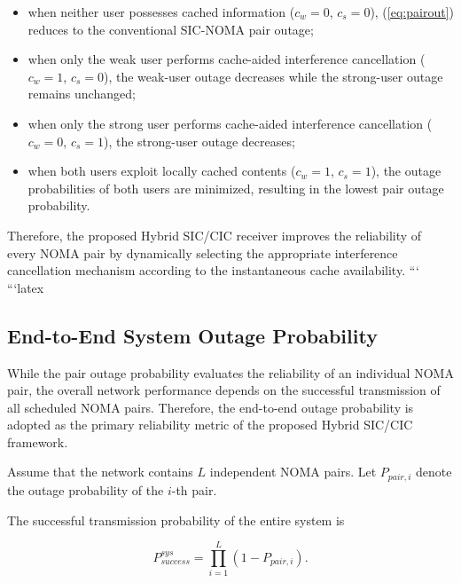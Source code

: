 \documentclass[conference]{IEEEtran}
\begin{document}
\begin{itemize}

\item when neither user possesses cached information ($c_w=0$, $c_s=0$), (\ref{eq:pairout}) reduces to the conventional SIC-NOMA pair outage;

\item when only the weak user performs cache-aided interference cancellation ($c_w=1$, $c_s=0$), the weak-user outage decreases while the strong-user outage remains unchanged;

\item when only the strong user performs cache-aided interference cancellation ($c_w=0$, $c_s=1$), the strong-user outage decreases;

\item when both users exploit locally cached contents ($c_w=1$, $c_s=1$), the outage probabilities of both users are minimized, resulting in the lowest pair outage probability.

\end{itemize}

Therefore, the proposed Hybrid SIC/CIC receiver improves the reliability of every NOMA pair by dynamically selecting the appropriate interference cancellation mechanism according to the instantaneous cache availability.
```
```latex
\subsection{End-to-End System Outage Probability}

While the pair outage probability evaluates the reliability of an individual NOMA pair, the overall network performance depends on the successful transmission of all scheduled NOMA pairs. Therefore, the end-to-end outage probability is adopted as the primary reliability metric of the proposed Hybrid SIC/CIC framework.

Assume that the network contains $L$ independent NOMA pairs. Let
$P_{pair,i}$ denote the outage probability of the $i$-th pair.

The successful transmission probability of the entire system is

\begin{equation}
P_{success}^{sys}
=
\prod_{i=1}^{L}
\left(1-P_{pair,i}\right).
\label{eq:success_system}
\end{equation}
\end{document}
